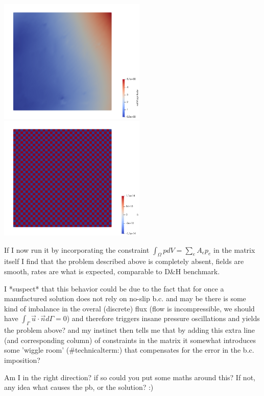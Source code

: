 \documentclass[a4paper]{article}
\begin{document}
\begin{center}
\includegraphics[width=7cm]{../results/exp09/velpb.png}
\includegraphics[width=7cm]{../results/exp09/presspb.png}
\end{center}

If I now run it by incorporating the constraint $\int_\Omega p dV = \sum_e A_e p_e$ in the 
matrix itself I find that the problem described above is completely absent, fields are smooth, 
rates are what is expected, comparable to D\&H benchmark. 

I *suspect* that this behavior could be due to the fact that for once a manufactured solution 
does not rely on no-slip b.c. and may be there is some kind of imbalance in the overal (discrete)
flux (flow is incompressible, we should have $\int_\Gamma \vec{u}\cdot\vec{n}d\Gamma=0$) 
and therefore triggers insane pressure oscillations and 
yields the problem above? and my instinct then tells me that 
by adding this extra line (and corresponding column) of constraints in the matrix it somewhat 
introduces some 'wiggle room' (\#technicalterm:) that compensates for the error in the b.c. imposition?
 
Am I in the right direction? if so could you put some maths around this? 
If not, any idea what causes the pb, or the solution? :)
 
\end{document}
